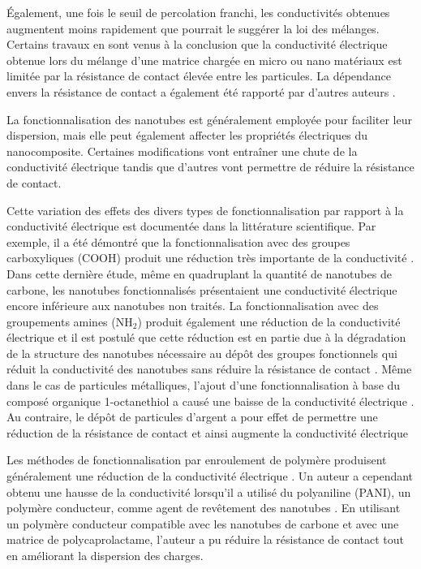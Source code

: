 Également, une fois le seuil de percolation franchi, les conductivités obtenues augmentent moins rapidement que pourrait le suggérer la loi des mélanges. 
Certains travaux \cite{Untereker2009,Cauchy2018} en sont venus à la conclusion que la conductivité électrique obtenue lors du mélange d'une matrice chargée en micro ou nano matériaux est limitée par la résistance de contact élevée entre les particules. 
La dépendance envers la résistance de contact a également été rapporté par d'autres auteurs \cite{Li2007a}. 

La fonctionnalisation des nanotubes est généralement employée pour faciliter leur dispersion, mais elle peut également affecter les propriétés électriques du nanocomposite. 
Certaines modifications vont entraîner une chute de la conductivité électrique tandis que d'autres vont permettre de réduire la résistance de contact. 

\FloatBarrier
Cette variation des effets des divers types de fonctionnalisation par rapport à la conductivité électrique est documentée dans la littérature scientifique. 
Par exemple, il a été démontré que la fonctionnalisation avec des groupes carboxyliques (COOH) produit une réduction très importante de la conductivité \cite{Guadagno2011}. 
Dans cette dernière étude, même en quadruplant la quantité de nanotubes de carbone, les nanotubes fonctionnalisés présentaient une conductivité électrique encore inférieure aux nanotubes non traités. 
La fonctionnalisation avec des groupements amines (NH$_2$) produit également une réduction de la conductivité électrique \cite{Ma2008} et il est postulé que cette réduction est en partie due à la dégradation de la structure des nanotubes nécessaire au dépôt des groupes fonctionnels qui réduit la conductivité des nanotubes sans réduire la résistance de contact \cite{Pandey2012a}.
Même dans le cas de particules métalliques, l'ajout d'une fonctionnalisation à base du composé organique 
1-octanethiol a causé une baisse de la conductivité électrique \cite{Gelves2008a}. 
Au contraire, le dépôt de particules d'argent a pour effet de permettre une réduction de la résistance de contact et ainsi augmente la conductivité électrique  \cite{Ma2010,Cauchy2017}

Les méthodes de fonctionnalisation par enroulement de polymère produisent généralement une réduction de la conductivité électrique \cite{Diez-Pascual2010, Huang2012}. 
Un auteur a cependant obtenu une hausse de la conductivité lorsqu'il a utilisé du polyaniline (PANI), un polymère conducteur, comme agent de revêtement des nanotubes \cite{Vankayala2011}. 
En utilisant un polymère conducteur compatible avec les nanotubes de carbone et avec une matrice de polycaprolactame, l'auteur a pu réduire la résistance de contact tout en améliorant la dispersion des charges. 

